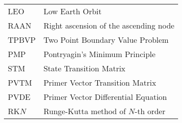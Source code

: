 \begin{longtable}{ll}
LEO & Low Earth Orbit \\
RAAN & Right ascension of the ascending node \\
TPBVP & Two Point Boundary Value Problem \\
PMP & Pontryagin's Minimum Principle \\
STM & State Transition Matrix \\
PVTM & Primer Vector Transition Matrix \\
PVDE & Primer Vector Differential Equation \\
RK\(N\) & Runge-Kutta method of \(N\)-th order
\end{longtable}

